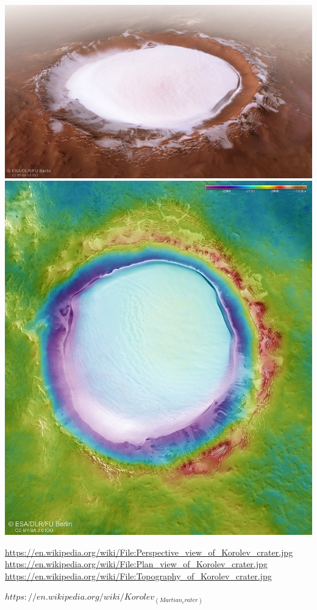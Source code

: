 \documentclass[10pt]{article}
\begin{document}
\includegraphics[width=1\textwidth]{1024px-Perspective_view_of_Korolev_crater1024x576.jpg}
\includegraphics[width=1\textwidth]{890px-Topography_of_Korolev_crater.jpg}


\url{https://en.wikipedia.org/wiki/File:Perspective_view_of_Korolev_crater.jpg}
\url{https://en.wikipedia.org/wiki/File:Plan_view_of_Korolev_crater.jpg}
\url{https://en.wikipedia.org/wiki/File:Topography_of_Korolev_crater.jpg}

$https://en.wikipedia.org/wiki/Korolev_(Martian_crater)$
\end{document}
